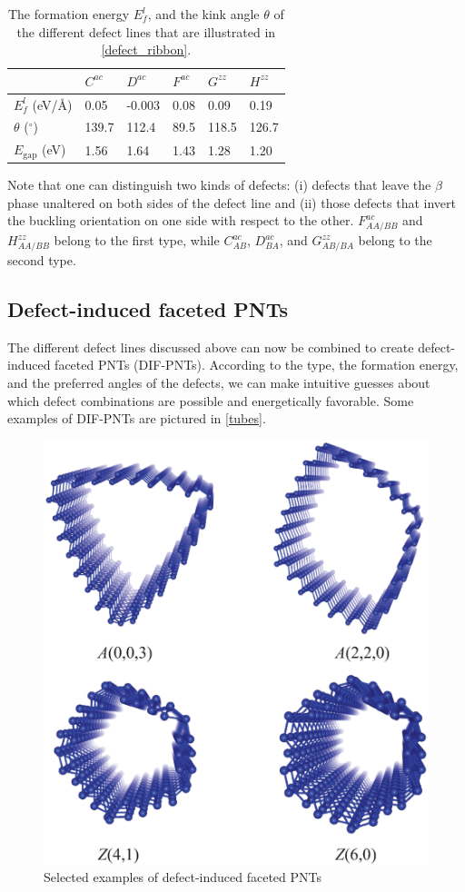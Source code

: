 \begin{table}[htb] 
\centering
\caption{The formation energy $E_f^l$, and the kink angle $\theta$ of the different defect lines that are illustrated in \autoref{defect_ribbon}. \label{tab-DL}}
\begin{tabularx}{0.8\linewidth}{l|XXXXX}   
\hline \hline
                      & $C^{ac}$ & $D^{ac}$ & $F^{ac}$  & $G^{zz}$ & $H^{zz}$\\
\hline
$E_f^l$	(eV/\AA)        &	 0.05  & -0.003  & 0.08 &  0.09  &  0.19 \\ 
$\theta$ ($^{\circ}$) &   139.7   &  112.4 & 89.5 & 118.5  & 126.7 \\
$E_{\text{gap}}$ (eV) & 1.56  & 1.64 & 1.43 & 1.28 & 1.20 \\
\hline \hline
\end{tabularx}
\end{table}


Note that one can distinguish two kinds of defects: (i) defects that leave the $\beta$ phase unaltered on both sides of the defect line and (ii) those defects that invert the buckling orientation on one side with respect to the other. $F_{AA/BB}^{ac}$ and $H_{AA/BB}^{zz}$ belong to the first type, while $C_{AB}^{ac}$, $D_{BA}^{ac}$, and $G_{AB/BA}^{zz}$ belong to the second type. 

\subsection{Defect-induced faceted PNTs}
The different defect lines discussed above can now be combined to create defect-induced faceted PNTs (DIF-PNTs).
According to the type, the formation energy, and the preferred angles of the defects, we can make intuitive guesses about which defect combinations are possible and energetically favorable. Some examples of DIF-PNTs are pictured in \autoref{tubes}. 

\begin{figure}[htb]
\centering
\includegraphics[width=0.7\linewidth]{Nanotu_tubes.eps}%
\caption{Selected examples of defect-induced faceted PNTs \label{tubes}}
\end{figure}

